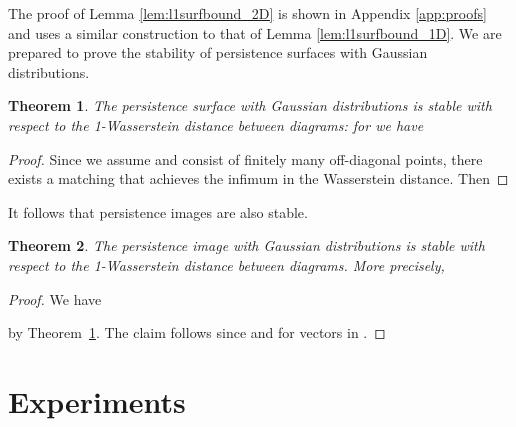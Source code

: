 \documentclass[11pt]{article}
\newtheorem{theorem}{Theorem}
\begin{document}
The proof of Lemma \ref{lem:l1surfbound_2D} is shown in Appendix \ref{app:proofs} and uses a similar construction to that of Lemma \ref{lem:l1surfbound_1D}. We are prepared to prove the stability of persistence surfaces with Gaussian distributions.

\begin{theorem}\label{thm:surface-stable-Gaussians}
The persistence surface  with Gaussian distributions is stable with respect to the 1-Wasserstein distance between diagrams: for  we have

\end{theorem}

\begin{proof}
Since we assume  and  consist of finitely many off-diagonal points, there exists a matching  that achieves the infimum in the Wasserstein distance. Then

\end{proof}

It follows that persistence images are also stable.

\begin{theorem}\label{thm:image-stable-Gaussians}
The persistence image  with Gaussian distributions is stable with respect to the 1-Wasserstein distance between diagrams.  More precisely,  

\end{theorem}

\begin{proof}
We have

by Theorem~\ref{thm:surface-stable-Gaussians}. The claim follows since  and  for vectors in .
\end{proof}


\section{Experiments}\label{sec:experiments}
\end{document}
